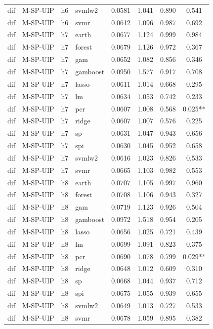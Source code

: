 \begin{ThreePartTable}
\begin{longtable}[t]{llclcccc}
dif & M-SP-UIP & h6 & svmlw2 & 0.0581 & 1.041 & 0.890 & 0.541\\
dif & M-SP-UIP & h6 & svmr & 0.0612 & 1.096 & 0.987 & 0.692\\
\addlinespace
dif & M-SP-UIP & h7 & earth & 0.0677 & 1.124 & 0.999 & 0.984\\
dif & M-SP-UIP & h7 & forest & 0.0679 & 1.126 & 0.972 & 0.367\\
dif & M-SP-UIP & h7 & gam & 0.0652 & 1.082 & 0.856 & 0.346\\
dif & M-SP-UIP & h7 & gamboost & 0.0950 & 1.577 & 0.917 & 0.708\\
dif & M-SP-UIP & h7 & lasso & 0.0611 & 1.014 & 0.668 & 0.295\\
dif & M-SP-UIP & h7 & lm & 0.0634 & 1.053 & 0.742 & 0.233\\
dif & M-SP-UIP & h7 & pcr & 0.0607 & 1.008 & 0.568 & 0.025**\\
dif & M-SP-UIP & h7 & ridge & 0.0607 & 1.007 & 0.576 & 0.225\\
dif & M-SP-UIP & h7 & sp & 0.0631 & 1.047 & 0.943 & 0.656\\
dif & M-SP-UIP & h7 & spi & 0.0630 & 1.045 & 0.952 & 0.658\\
dif & M-SP-UIP & h7 & svmlw2 & 0.0616 & 1.023 & 0.826 & 0.533\\
dif & M-SP-UIP & h7 & svmr & 0.0665 & 1.103 & 0.982 & 0.553\\
\addlinespace
dif & M-SP-UIP & h8 & earth & 0.0707 & 1.105 & 0.997 & 0.960\\
dif & M-SP-UIP & h8 & forest & 0.0708 & 1.106 & 0.943 & 0.327\\
dif & M-SP-UIP & h8 & gam & 0.0719 & 1.123 & 0.926 & 0.504\\
dif & M-SP-UIP & h8 & gamboost & 0.0972 & 1.518 & 0.954 & 0.205\\
dif & M-SP-UIP & h8 & lasso & 0.0656 & 1.025 & 0.721 & 0.439\\
dif & M-SP-UIP & h8 & lm & 0.0699 & 1.091 & 0.823 & 0.375\\
dif & M-SP-UIP & h8 & pcr & 0.0690 & 1.078 & 0.799 & 0.029**\\
dif & M-SP-UIP & h8 & ridge & 0.0648 & 1.012 & 0.609 & 0.310\\
dif & M-SP-UIP & h8 & sp & 0.0668 & 1.044 & 0.937 & 0.712\\
dif & M-SP-UIP & h8 & spi & 0.0675 & 1.055 & 0.939 & 0.655\\
dif & M-SP-UIP & h8 & svmlw2 & 0.0649 & 1.013 & 0.727 & 0.533\\
dif & M-SP-UIP & h8 & svmr & 0.0678 & 1.059 & 0.895 & 0.382\\

\end{longtable}
\end{ThreePartTable}
